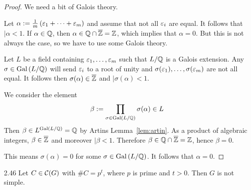 \documentclass[twoside = false,	%
		headsepline,		%
		parskip = true,
		]{scrbook}						%
\begin{document}
    \begin{proof}
        We need a bit of Galois theory.

        Let $\alpha:= \frac{1}{m}\left( \varepsilon_1 + \dots + \varepsilon_m \right)$ and assume that not all $\varepsilon_i$ are equal.
        It 
        follows that $\vert{\alpha} < 1$. If $\alpha \in \mathbb Q$, then $\alpha \in \mathbb Q \cap \overline{\mathbb Z} = \mathbb Z$, which implies that $\alpha = 0$.
        But this is not always the case, so we have to use some Galois theory.

        Let $L$ be a field containing $\varepsilon_1,\dots,\varepsilon_m$ such that $L/\mathbb Q$ is a Galois extension. Any $\sigma \in \mathrm{Gal}\left( L/\mathbb Q\right)$ will send $\varepsilon_i$ to a root of unity and
        $\sigma(\varepsilon_1),\dots,\sigma(\varepsilon_m)$ are not all equal. It follows then $\sigma(\alpha) \in \overline{\mathbb Z}$ and $\vert{\sigma(\alpha)} < 1$.

        We consider the element
        \begin{equation*}
            \beta := \prod_{\sigma \in \mathrm{Gal}\left( L/\mathbb Q\right)} \sigma(\alpha) \in L
        \end{equation*}
        Then $\beta \in L^{\mathrm{Gal}\left( L/\mathbb Q\right)} = \mathbb Q $ by Artins Lemma~\ref{lem:artin}. As a product of algebraic integers, $\beta \in \overline{\mathbb Z}$ and moreover $\vert{\beta} < 1$.
        Therefore $\beta \in \mathbb Q \cap \overline{\mathbb Z} = \mathbb Z$, hence $\beta = 0$.

        This means $\sigma(\alpha) = 0$ for some $\sigma \in \mathrm{Gal}\left( L/\mathbb Q\right)$. It follows that $\alpha = 0$.
    \end{proof}

    \begin{proposition}{}{2.46}
        Let $C \in \mathcal C(G)$ with $\#C = p^t$, where $p$ is prime and $t>0$. Then $G$ is not simple.
    \end{proposition}
\end{document}
